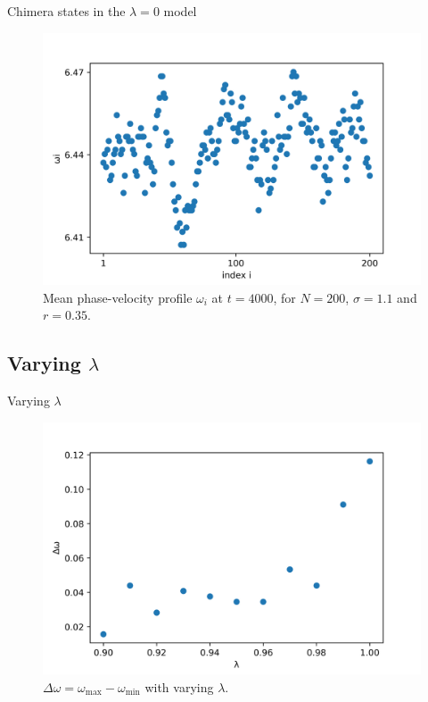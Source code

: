 \documentclass{beamer}
\begin{document}
\begin{frame}{Chimera states in the $\lambda = 0$ model}
\begin{figure}[H]
\centering
\includegraphics[width = 0.6 \textwidth]{w_N=200_sigma=1.4_t=4000.png}
\caption{Mean phase-velocity profile $\omega_i$ at $t=4000$, for $N=200$, $\sigma=1.1$ and $r=0.35$.}
\label{1.4omega}
\end{figure}
\end{frame}

\subsection{Varying $\lambda$}

\begin{frame}{Varying $\lambda$} \pause

\begin{figure}[H]
\centering
\includegraphics[width = 0.6 \textwidth]{deltawvslmd.png}
\caption{$\Delta \omega = \omega_{\text{max}}-\omega_{\text{min}}$ with varying $\lambda$.}
\label{vslmd}
\end{figure}

\end{frame}
\end{document}

